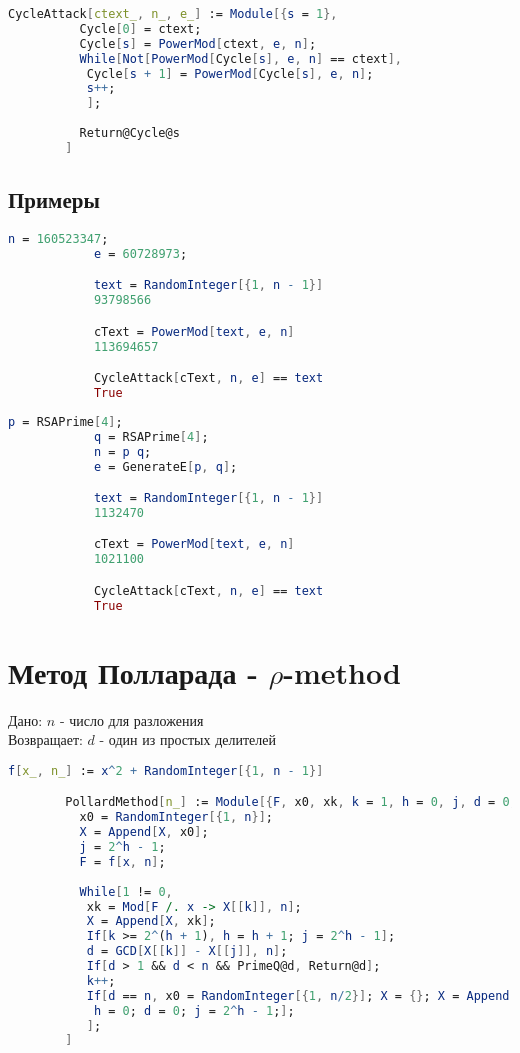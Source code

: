 		\begin{lstlisting}[language=Mathematica,caption={
      		Циклическая атака
    	}]
		CycleAttack[ctext_, n_, e_] := Module[{s = 1},
		  Cycle[0] = ctext;
		  Cycle[s] = PowerMod[ctext, e, n];
		  While[Not[PowerMod[Cycle[s], e, n] == ctext],
		   Cycle[s + 1] = PowerMod[Cycle[s], e, n];
		   s++;
		   ];
		  
		  Return@Cycle@s
		]
    	\end{lstlisting}

    	\subsection{Примеры}

	    	\begin{lstlisting}[language=Mathematica,caption={
	      		Пример 1
	    	}]
			n = 160523347;
			e = 60728973;

			text = RandomInteger[{1, n - 1}]
			93798566

			cText = PowerMod[text, e, n]
			113694657

			CycleAttack[cText, n, e] == text
			True
	    	\end{lstlisting}

	    	\begin{lstlisting}[language=Mathematica,caption={
	      		Пример 2
	    	}]
			p = RSAPrime[4];
			q = RSAPrime[4];
			n = p q;
			e = GenerateE[p, q];

			text = RandomInteger[{1, n - 1}]
			1132470

			cText = PowerMod[text, e, n]
			1021100

			CycleAttack[cText, n, e] == text
			True
	    	\end{lstlisting}

	\section{Метод Полларада - $\rho$-method}
		Дано: $n$ - число для разложения \\
		Возвращает: $d$ - один из простых делителей

		\begin{lstlisting}[language=Mathematica,caption={
      		Метод Полларада
    	}]
		f[x_, n_] := x^2 + RandomInteger[{1, n - 1}]

		PollardMethod[n_] := Module[{F, x0, xk, k = 1, h = 0, j, d = 0, X = {}},
		  x0 = RandomInteger[{1, n}];
		  X = Append[X, x0];
		  j = 2^h - 1;
		  F = f[x, n];
		  
		  While[1 != 0,
		   xk = Mod[F /. x -> X[[k]], n];
		   X = Append[X, xk];
		   If[k >= 2^(h + 1), h = h + 1; j = 2^h - 1];
		   d = GCD[X[[k]] - X[[j]], n];
		   If[d > 1 && d < n && PrimeQ@d, Return@d];
		   k++;
		   If[d == n, x0 = RandomInteger[{1, n/2}]; X = {}; X = Append[X, x0]; k = 1; 
		    h = 0; d = 0; j = 2^h - 1;];
		   ];
		]
    	\end{lstlisting}

